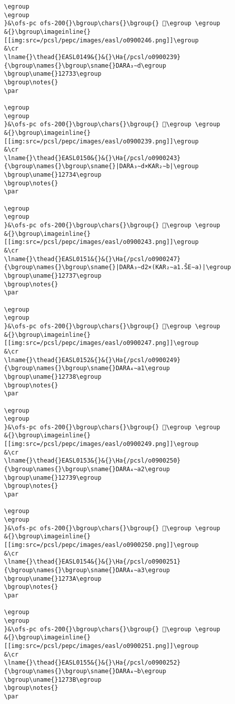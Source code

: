 \begin{verbatim}
\egroup
\egroup
}&\ofs-pc ofs-200{}\bgroup\chars{}\bgroup{} 𒜱\egroup \egroup
&{}\bgroup\imageinline{}[[img:src=/pcsl/pepc/images/easl/o0900246.png]]\egroup
&\cr
\lname{}\thead{}EASL0149&{}&{}\Ha{/pcsl/o0900239}{\bgroup\names{}\bgroup\sname{}DARA₃∼d\egroup
\bgroup\uname{}12733\egroup
\bgroup\notes{}
\par 

\egroup
\egroup
}&\ofs-pc ofs-200{}\bgroup\chars{}\bgroup{} 𒜳\egroup \egroup
&{}\bgroup\imageinline{}[[img:src=/pcsl/pepc/images/easl/o0900239.png]]\egroup
&\cr
\lname{}\thead{}EASL0150&{}&{}\Ha{/pcsl/o0900243}{\bgroup\names{}\bgroup\sname{}|DARA₃∼d×KAR₂∼b|\egroup
\bgroup\uname{}12734\egroup
\bgroup\notes{}
\par 

\egroup
\egroup
}&\ofs-pc ofs-200{}\bgroup\chars{}\bgroup{} 𒜴\egroup \egroup
&{}\bgroup\imageinline{}[[img:src=/pcsl/pepc/images/easl/o0900243.png]]\egroup
&\cr
\lname{}\thead{}EASL0151&{}&{}\Ha{/pcsl/o0900247}{\bgroup\names{}\bgroup\sname{}|DARA₃∼d2×(KAR₂∼a1.ŠE∼a)|\egroup
\bgroup\uname{}12737\egroup
\bgroup\notes{}
\par 

\egroup
\egroup
}&\ofs-pc ofs-200{}\bgroup\chars{}\bgroup{} 𒜷\egroup \egroup
&{}\bgroup\imageinline{}[[img:src=/pcsl/pepc/images/easl/o0900247.png]]\egroup
&\cr
\lname{}\thead{}EASL0152&{}&{}\Ha{/pcsl/o0900249}{\bgroup\names{}\bgroup\sname{}DARA₄∼a1\egroup
\bgroup\uname{}12738\egroup
\bgroup\notes{}
\par 

\egroup
\egroup
}&\ofs-pc ofs-200{}\bgroup\chars{}\bgroup{} 𒜸\egroup \egroup
&{}\bgroup\imageinline{}[[img:src=/pcsl/pepc/images/easl/o0900249.png]]\egroup
&\cr
\lname{}\thead{}EASL0153&{}&{}\Ha{/pcsl/o0900250}{\bgroup\names{}\bgroup\sname{}DARA₄∼a2\egroup
\bgroup\uname{}12739\egroup
\bgroup\notes{}
\par 

\egroup
\egroup
}&\ofs-pc ofs-200{}\bgroup\chars{}\bgroup{} 𒜹\egroup \egroup
&{}\bgroup\imageinline{}[[img:src=/pcsl/pepc/images/easl/o0900250.png]]\egroup
&\cr
\lname{}\thead{}EASL0154&{}&{}\Ha{/pcsl/o0900251}{\bgroup\names{}\bgroup\sname{}DARA₄∼a3\egroup
\bgroup\uname{}1273A\egroup
\bgroup\notes{}
\par 

\egroup
\egroup
}&\ofs-pc ofs-200{}\bgroup\chars{}\bgroup{} 𒜺\egroup \egroup
&{}\bgroup\imageinline{}[[img:src=/pcsl/pepc/images/easl/o0900251.png]]\egroup
&\cr
\lname{}\thead{}EASL0155&{}&{}\Ha{/pcsl/o0900252}{\bgroup\names{}\bgroup\sname{}DARA₄∼b\egroup
\bgroup\uname{}1273B\egroup
\bgroup\notes{}
\par 


\end{verbatim}
